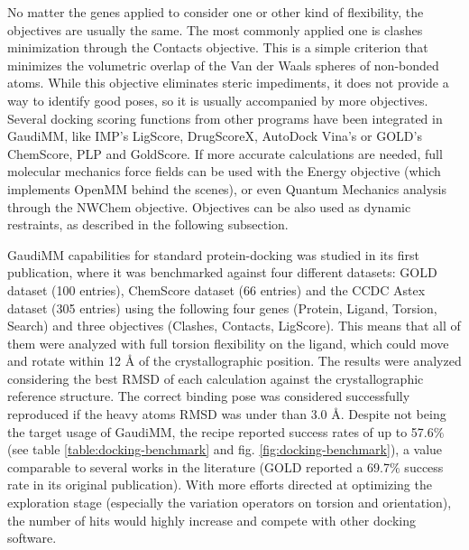 No matter the genes applied to consider one or other kind of flexibility, the objectives are usually the same. The most commonly applied one is clashes minimization through the Contacts objective. This is a simple criterion that minimizes the volumetric overlap of the Van der Waals spheres of non-bonded atoms. While this objective eliminates steric impediments, it does not provide a way to identify good poses, so it is usually accompanied by more objectives. Several docking scoring functions from other programs have been integrated in GaudiMM, like IMP’s LigScore,\cite{krammer2005ligscore} DrugScoreX,\cite{neudert2011dsx} AutoDock Vina’s\cite{trott2010autodock} or GOLD’s ChemScore, PLP and GoldScore.\cite{verdonk2003improved} If more accurate calculations are needed, full molecular mechanics force fields can be used with the Energy objective (which implements OpenMM behind the scenes), or even Quantum Mechanics analysis through the NWChem objective. Objectives can be also used as dynamic restraints, as described in the following subsection.


GaudiMM capabilities for standard protein-docking was studied in its first publication,\cite{gaudimm} where it was benchmarked against four different datasets: GOLD dataset (100 entries), ChemScore dataset (66 entries) and the CCDC Astex dataset (305 entries) using the following four genes (Protein, Ligand, Torsion, Search) and three objectives (Clashes, Contacts, LigScore). This means that all of them were analyzed with full torsion flexibility on the ligand, which could move and rotate within 12 Å of the crystallographic position. The results were analyzed considering the best RMSD of each calculation against the crystallographic reference structure. The correct binding pose was considered successfully reproduced if the heavy atoms RMSD was under than 3.0 Å. Despite not being the target usage of GaudiMM, the recipe reported success rates of up to 57.6$\%$ (see table \ref{table:docking-benchmark} and fig. \ref{fig:docking-benchmark}), a value comparable to several works in the literature (GOLD reported a 69.7$\%$  success rate in its original publication).\cite{gold} With more efforts directed at optimizing the exploration stage (especially the variation operators on torsion and orientation), the number of hits would highly increase and compete with other docking software.







